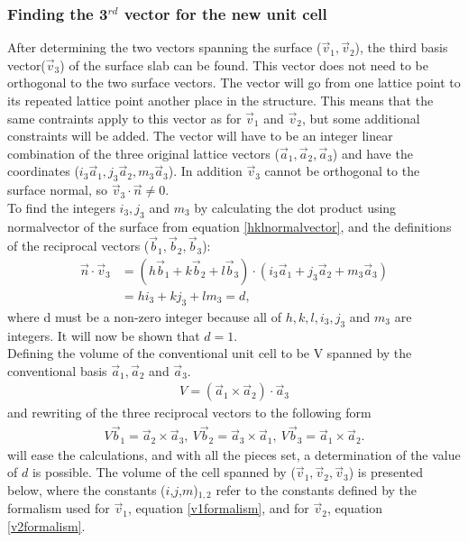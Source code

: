 \documentclass[11pt]{article} %
\begin{document}
\subsubsection{Finding the 3$^{rd}$ vector for the new unit cell}
After determining the two vectors spanning the surface ($\vec{v}_1,\vec{v}_2$), the third basis vector($\vec{v}_3$) of the surface slab can be found. This vector does not need to be orthogonal to the two surface vectors. The vector will go from one lattice point to its repeated lattice point another place in the structure. This means that the same contraints apply to this vector as for $\vec{v}_1$ and $\vec{v}_2$, but some additional constraints will be added. The vector will have to be an integer linear combination of the three original lattice vectors ($\vec{a}_1, \vec{a}_2, \vec{a}_3$) and have the coordinates ($i_3\vec{a}_1,j_3\vec{a}_2,m_3\vec{a}_3$). In addition $\vec{v}_3$ cannot be orthogonal to the surface normal, so $\vec{v}_3\cdot\vec{n}\neq 0$. \\
To find the integers $i_3, j_3$ and $m_3$ by calculating the dot product using normalvector of the surface from equation \ref{hklnormalvector}, and the definitions of the reciprocal vectors ($\vec{b}_1,\vec{b}_2,\vec{b}_3$):
\begin{eqnarray}
 \vec{n} \cdot \vec{v}_3 & = (h \vec{b}_1 + k \vec{b}_2 + l \vec{b}_3 ) \cdot (i_3\vec{a}_1 + j_3\vec{a}_2 + m_3\vec{a}_3) \nonumber \\
 & = hi_3+kj_3+lm_3 = d \label{vdotn},
\end{eqnarray}
where d must be a non-zero integer because all of $h,k,l,i_3,j_3$ and $m_3$ are integers. It will now be shown that $d = 1$.\\
Defining the volume of the conventional unit cell to be V spanned by the conventional basis $\vec{a}_1, \vec{a}_2$ and $\vec{a}_3$.
\begin{eqnarray}
 V = (\vec{a}_1 \times \vec{a}_2) \cdot \vec{a}_3
\end{eqnarray}
and rewriting of the three reciprocal vectors to the following form
\begin{eqnarray}
V\vec{b}_1 = \vec{a}_2 \times \vec{a}_3, \ V\vec{b}_2 = \vec{a}_3 \times \vec{a}_1, \ V\vec{b}_3 = \vec{a}_1 \times \vec{a}_2. 
\end{eqnarray}
will ease the calculations, and with all the pieces set, a determination of the value of $d$ is possible. The volume of the cell spanned by ($\vec{v}_1,\vec{v}_2,\vec{v}_3$) is presented below, where the constants ($i$,$j$,$m$)$_{1,2}$ refer to the constants defined by the formalism used for $\vec{v}_1$, equation \ref{v1formalism}, and for $\vec{v}_2$, equation \ref{v2formalism}.
\end{document}
